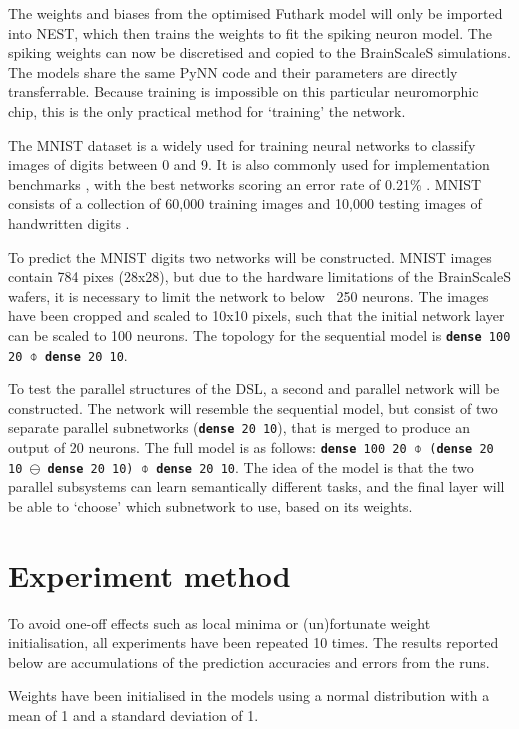 \documentclass[report.tex]{subfiles}
\begin{document}
The weights and biases from the optimised Futhark model will only be imported into NEST,
which then trains the weights to fit the spiking neuron model.
The spiking weights can now be discretised and copied to the BrainScaleS
simulations. 
The models share the same PyNN code and their parameters are directly
transferrable.
Because training is impossible on this particular neuromorphic chip, this is the
only practical method for `training' the network.

The MNIST dataset is a widely used for training neural networks to classify
images of digits between 0 and 9. 
It is also commonly used for implementation benchmarks \cite{Schmidhuber2014,
Schmitt2017}, with the best networks scoring an error rate of 0.21\%
\cite{LeCun2019}.
MNIST consists of a collection of 60,000 training images and 10,000 testing images of handwritten digits \cite{LeCun1998}.

To predict the MNIST digits two networks will be constructed.
MNIST images contain 784 pixes (28x28), but due to the hardware limitations
of the BrainScaleS wafers, it is necessary to limit the network to below ~250 neurons.
The images have been cropped and scaled to 10x10 pixels, such that the initial
network layer can be scaled to 100 neurons.
The topology for the sequential model is \texttt{\textbf{dense} 100 20 $\obar$ \textbf{dense} 20 10}.

To test the parallel structures of the \gls{DSL}, a second and parallel network
will be constructed.
The network will resemble the sequential model, but consist of two separate
parallel subnetworks (\texttt{\textbf{dense} 20 10}), that is merged to produce
an output of 20 neurons.
The full model is as follows:
\texttt{\textbf{dense} 100 20 $\obar$ (\textbf{dense} 20 10 $\ominus$\
\textbf{dense} 20 10) $\obar$ \textbf{dense} 20 10}.
The idea of the model is that the two parallel subsystems can learn semantically
different tasks, and the final layer will be able to `choose' which subnetwork to
use, based on its weights.

\section{Experiment method}
To avoid one-off effects such as local minima or (un)fortunate weight
initialisation, all experiments have been repeated 10 times.
The results reported below are accumulations of the prediction accuracies
and errors from the runs.

Weights have been initialised in the models using a normal distribution with a
mean of 1 and a standard deviation of 1.
\end{document}
